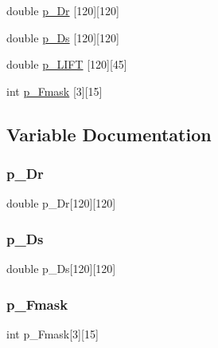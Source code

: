 \begin{DoxyCompactItemize}
\item 
double \hyperlink{a00545_a62a4765c5a64f828cc96a9e3d1c08c9f}{p\+\_\+\+Dr} \mbox{[}120\mbox{]}\mbox{[}120\mbox{]}
\item 
double \hyperlink{a00545_a3c8eed26b76aaa80b080d77d7decf0d6}{p\+\_\+\+Ds} \mbox{[}120\mbox{]}\mbox{[}120\mbox{]}
\item 
double \hyperlink{a00545_adeca9a4dc0ce863a154f6f0ab2c1d510}{p\+\_\+\+L\+I\+FT} \mbox{[}120\mbox{]}\mbox{[}45\mbox{]}
\item 
int \hyperlink{a00545_aea6f1187b8d47ebb9c1c3bf95aaf2c3a}{p\+\_\+\+Fmask} \mbox{[}3\mbox{]}\mbox{[}15\mbox{]}
\end{DoxyCompactItemize}


\subsection{Variable Documentation}
\mbox{\label{a00545_a62a4765c5a64f828cc96a9e3d1c08c9f}} 
\subsubsection{\texorpdfstring{p\+\_\+\+Dr}{p\_Dr}}
{\footnotesize\ttfamily double p\+\_\+\+Dr\mbox{[}120\mbox{]}\mbox{[}120\mbox{]}}

\mbox{\label{a00545_a3c8eed26b76aaa80b080d77d7decf0d6}} 
\subsubsection{\texorpdfstring{p\+\_\+\+Ds}{p\_Ds}}
{\footnotesize\ttfamily double p\+\_\+\+Ds\mbox{[}120\mbox{]}\mbox{[}120\mbox{]}}

\mbox{\label{a00545_aea6f1187b8d47ebb9c1c3bf95aaf2c3a}} 
\subsubsection{\texorpdfstring{p\+\_\+\+Fmask}{p\_Fmask}}
{\footnotesize\ttfamily int p\+\_\+\+Fmask\mbox{[}3\mbox{]}\mbox{[}15\mbox{]}}

